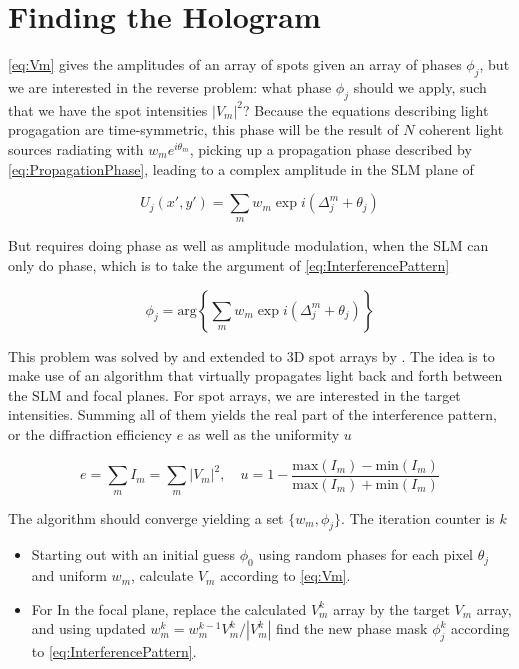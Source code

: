 \section{Finding the Hologram}\label{sec:GSW}

\cref{eq:Vm} gives the amplitudes of an array of spots given an array of phases $\phi_j$, but we are interested in the reverse problem: what phase $\phi_j$ should we apply, such that we have the spot intensities $|V_m|^2$? Because the equations describing light progagation are time-symmetric, this phase will be the result of $N$ coherent light sources radiating with $w_m e^{i \theta_m}$, picking up a propagation phase described by \cref{eq:PropagationPhase}, leading to a complex amplitude in the \ac{SLM} plane of 

\begin{equation}\label{eq:InterferencePattern}
    U_j (x',y') = \sum_m w_m \exp{
    i\left(\Delta_j^m + \theta_j\right)
    }
\end{equation}

But requires doing phase as well as amplitude modulation, when the SLM can only do phase, which is to take the argument of \cref{eq:InterferencePattern}

\begin{equation}\label{eq:Argument}
    \phi_j = \text{arg}\left\{
     \sum_m w_m \exp{
    i\left(\Delta_j^m + \theta_j\right)
    }
    \right\}
\end{equation}

This problem was solved by \cite{Gerschberg1972} and extended to 3D spot arrays by \cite{DiLeonardo2007}. The idea is to make use of an algorithm that virtually propagates light back and forth between the SLM and focal planes. For spot arrays, we are interested in the target intensities. Summing all of them yields the real part of the interference pattern, or the diffraction efficiency $e$ as well as the uniformity $u$

\begin{equation}
    e = \sum_m I_m = \sum_m |V_m|^2, 
    \quad 
    u = 1-\frac{\text{max}(I_m)-\text{min}(I_m)}{\text{max}(I_m)+\text{min}(I_m)}
\end{equation}

The algorithm should converge yielding a set $\{w_m, \phi_j\}$. The iteration counter is $k$

\begin{itemize}
    \item Starting out with an initial guess $\phi_0$ using random phases for each pixel $\theta_j$ and uniform $w_m$, calculate $V_m$ according to \cref{eq:Vm}. 
    
    \item For In the focal plane, replace the calculated $V_m^k$ array by the target $V_m$ array, and using updated $w_m^k = w_m^{k-1} V_m^k / |V_m^k|$ find the new phase mask $\phi_j^k$ according to \cref{eq:InterferencePattern}.
\end{itemize}

